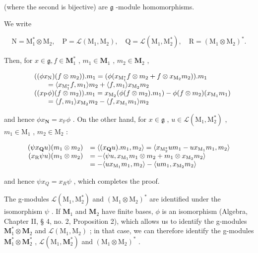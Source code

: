 (where the second is bijective) are \(\mathfrak{g}\) -module homomorphisms.

We write

\[
\mathrm{N} = \mathrm{M} _ {1} ^ {*} \otimes \mathrm{M} _ {2}, \quad \mathrm{P} = \mathscr {L} (\mathrm{M} _ {1}, \mathrm{M} _ {2}), \quad \mathrm{Q} = \mathscr {L} (\mathrm{M} _ {1}, \mathrm{M} _ {2} ^ {*}), \quad \mathrm{R} = (\mathrm{M} _ {1} \otimes \mathrm{M} _ {2}) ^ {*}.
\]

Then, for \(x \in \mathfrak{g}, f \in \mathbf{M}_1^*\) , \(m_1 \in \mathbf{M}_1\) , \(m_2 \in \mathbf{M}_2\) ,

\[
\begin{array}{r l} & {((\phi x _ {\mathrm{N}}) (f \otimes m _ {2})). m _ {1} = (\phi (x _ {\mathrm{M} _ {1} ^ {*}} f \otimes m _ {2} + f \otimes x _ {\mathrm{M} _ {2}} m _ {2})). m _ {1}} \\ & {\qquad = \langle x _ {\mathrm{M} _ {1} ^ {*}} f, m _ {1} \rangle m _ {2} + \langle f, m _ {1} \rangle x _ {\mathrm{M} _ {2}} m _ {2}} \\ & {((x _ {\mathrm{P}} \phi) (f \otimes m _ {2})). m _ {1} = x _ {\mathrm{M} _ {2}} (\phi (f \otimes m _ {2}). m _ {1}) - \phi (f \otimes m _ {2}) (x _ {\mathrm{M} _ {1}} m _ {1})} \\ & {\qquad = \langle f, m _ {1} \rangle x _ {\mathrm{M} _ {2}} m _ {2} - \langle f, x _ {\mathrm{M} _ {1}} m _ {1} \rangle m _ {2}} \end{array}
\]

and hence \(\phi x_{\mathbf{N}} = x_{\mathbb{P}}\phi\) . On the other hand, for \(x \in \mathfrak{g}\) , \(u \in \mathcal{L}(\mathrm{M}_1, \mathrm{M}_2^*)\) , \(m_1 \in \mathrm{M}_1\) , \(m_2 \in \mathrm{M}_2\) :

\[
\begin{array}{r l} (\psi x _ {\mathbf {Q}} u) (m _ {1} \otimes m _ {2}) & = \langle (x _ {\mathbf {Q}} u). m _ {1}, m _ {2} \rangle = \langle x _ {\mathrm{M} _ {2} ^ {*}} u m _ {1} - u x _ {\mathrm{M} _ {1}} m _ {1}, m _ {2} \rangle \\ (x _ {\mathrm{R}} \psi u) (m _ {1} \otimes m _ {2}) & = - \langle \psi u, x _ {\mathrm{M} _ {1}} m _ {1} \otimes m _ {2} + m _ {1} \otimes x _ {\mathrm{M} _ {2}} m _ {2} \rangle \\ & = - \langle u x _ {\mathrm{M} _ {1}} m _ {1}, m _ {2} \rangle - \langle u m _ {1}, x _ {\mathrm{M} _ {2}} m _ {2} \rangle \end{array}
\]

and hence \(\psi x_{Q} = x_{R}\psi\) , which completes the proof.

The g-modules \(\mathcal{L}(\mathrm{M}_1,\mathrm{M}_2^*)\) and \((\mathrm{M}_1\otimes \mathrm{M}_2)^*\) are identified under the isomorphism \(\psi\) . If \(\mathbf{M}_1\) and \(\mathbf{M}_2\) have finite bases, \(\phi\) is an isomorphism (Algebra, Chapter II, § 4, no. 2, Proposition 2), which allows us to identify the g-modules \(\mathbf{M}_1^*\otimes \mathbf{M}_2\) and \(\mathcal{L}(\mathrm{M}_1,\mathrm{M}_2)\) ; in that case, we can therefore identify the g-modules \(\mathbf{M}_1^*\otimes \mathbf{M}_2^*\) , \(\mathcal{L}(\mathrm{M}_1,\mathbf{M}_2^*)\) and \((\mathrm{M}_1\otimes \mathrm{M}_2)^*\) .

